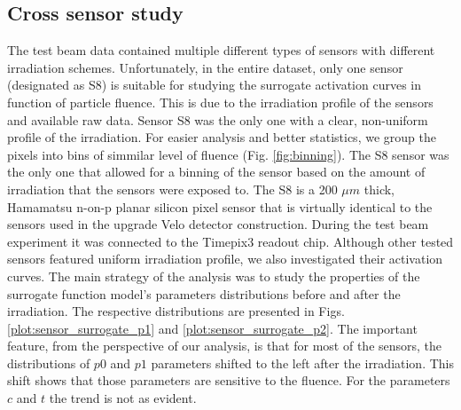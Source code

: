 \subsection{Cross sensor study}
The test beam data contained multiple different types of sensors with different irradiation schemes.
Unfortunately, in the entire dataset, only one sensor (designated as S8) is suitable for studying the surrogate activation curves in function of particle fluence.
This is due to the irradiation profile of the sensors and available raw data.
Sensor S8 was the only one with a clear, non-uniform profile of the irradiation.
For easier analysis and better statistics, we group the pixels into bins of simmilar level of fluence (Fig. \ref{fig:binning}).
The S8 sensor was the only one that allowed for a binning of the sensor based on the amount of irradiation that the sensors were exposed to. The S8 is a 200 $\mu m$ thick, Hamamatsu n-on-p planar silicon pixel sensor that is virtually identical to the sensors used in the upgrade Velo detector construction. During the test beam experiment it was connected to the Timepix3 readout chip.
Although other tested sensors featured uniform irradiation profile, we also investigated their activation curves. 
The main strategy of the analysis was to study the properties of the surrogate function model's parameters distributions before and after the irradiation. 
The respective distributions are presented in Figs. \ref{plot:sensor_surrogate_p1}  and \ref{plot:sensor_surrogate_p2}.
The important feature, from the perspective of our analysis, is that for most of the sensors, the distributions of $p0$ and $p1$ parameters shifted to the left after the irradiation. This shift shows that those parameters are sensitive to the fluence.
For the parameters $c$ and $t$ the trend is not as evident.

